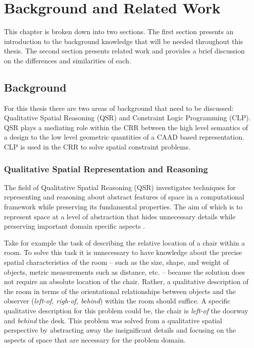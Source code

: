 \documentclass[12pt]{ucthesis}
\begin{document}
\chapter{Background and Related Work} 
This chapter is broken down into two sections. The first section presents an introduction to the background knowledge that will be needed throughout this thesis. The second section presents related work and provides a brief discussion on the differences and similarities of each.  

\section{Background}
\label{background}
For this thesis there are two areas of background that need to be discussed: Qualitative Spatial Reasoning (QSR) and Constraint Logic Programming (CLP). QSR plays a mediating role within the CRR between the high level semantics of a design to the low level geometric quantities of a CAAD based representation. CLP is used in the CRR to solve spatial constraint problems.

\subsection{Qualitative Spatial Representation and Reasoning}
The field of Qualitative Spatial Reasoning (QSR) investigates techniques for representing and reasoning about abstract features of space in a computational framework while preserving its fundamental properties. The aim of which is to represent space at a level of abstraction that hides unnecessary details while preserving important domain specific aspects \cite{freksa1991qsr} \cite{bhattSpatialComputing}. 

Take for example the task of describing the relative location of a chair within a room. To solve this task it is unnecessary to have knowledge about the precise spatial characteristics of the room -- such as the size, shape, and weight of objects, metric measurements such as distance, etc. -- because the solution does not require an absolute location of the chair. Rather, a qualitative description of the room in terms of the orientational relationships between objects and the observer (\emph{left-of, righ-of, behind}) within the room should suffice. A specific qualitative description for this problem could be, the chair is \emph{left-of} the doorway and \emph{behind} the desk. This problem was solved from a qualitative spatial perspective by abstracting away the insignificant details and focusing on the aspects of space that are necessary for the problem domain. 
\end{document}

